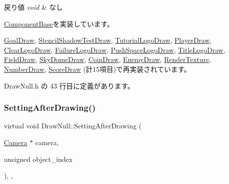 \begin{DoxyRetVals}{戻り値}
{\em void} & なし \\
\hline
\end{DoxyRetVals}


\mbox{\hyperlink{class_component_base_a125939d6befe42f28886a6523e86b18b}{Component\+Base}}を実装しています。



\mbox{\hyperlink{class_goal_draw_a3eb0a555fa2db9d2c1253018ea65796e}{Goal\+Draw}}, \mbox{\hyperlink{class_stencil_shadow_test_draw_a65be72e71cd12cacf315b0364c12c3e3}{Stencil\+Shadow\+Test\+Draw}}, \mbox{\hyperlink{class_tutorial_logo_draw_a53fc4b1b23c7f9e249600be67510f944}{Tutorial\+Logo\+Draw}}, \mbox{\hyperlink{class_player_draw_ad79a0fbeb618e0913822b573e5d0be68}{Player\+Draw}}, \mbox{\hyperlink{class_clear_logo_draw_a9af656c0a8ebfb5fa133a0983add6ffd}{Clear\+Logo\+Draw}}, \mbox{\hyperlink{class_failure_logo_draw_a718d587edcabb1feea72153a79a65176}{Failure\+Logo\+Draw}}, \mbox{\hyperlink{class_push_space_logo_draw_a7ad3fe53d9bda4ea16c958bc102ff54e}{Push\+Space\+Logo\+Draw}}, \mbox{\hyperlink{class_title_logo_draw_a9f70fb70639510908f4e07ee14667e30}{Title\+Logo\+Draw}}, \mbox{\hyperlink{class_field_draw_a4287d2ce33033b2413c1d3a81b173373}{Field\+Draw}}, \mbox{\hyperlink{class_sky_dome_draw_a5b82e8b650a20dbc0b7ed720d1fb7fab}{Sky\+Dome\+Draw}}, \mbox{\hyperlink{class_coin_draw_ad0f5da5cfb896541fd59b1ab4a8593d1}{Coin\+Draw}}, \mbox{\hyperlink{class_enemy_draw_aa1659c35fa757db6a6cf07e26ad9ddfb}{Enemy\+Draw}}, \mbox{\hyperlink{class_render_texture_a498eb8be8672e01164b3770cdff43291}{Render\+Texture}}, \mbox{\hyperlink{class_number_draw_ad52c1e8b9ae6e830a82c440cc18cb6c9}{Number\+Draw}}, \mbox{\hyperlink{class_score_draw_af013abb96136825e71d4fee06529fc69}{Score\+Draw}} (計15項目)で再実装されています。



 Draw\+Null.\+h の 43 行目に定義があります。

\mbox{\label{class_draw_null_a76edfc5af0bf3275f96f40394aff8510}} 
\subsubsection{\texorpdfstring{Setting\+After\+Drawing()}{SettingAfterDrawing()}}
{\footnotesize\ttfamily virtual void Draw\+Null\+::\+Setting\+After\+Drawing (\begin{DoxyParamCaption}\item[{\mbox{\hyperlink{class_camera}{Camera}} $\ast$}]{camera,  }\item[{unsigned}]{object\+\_\+index }\end{DoxyParamCaption})\hspace{0.3cm}{\ttfamily [inline]}, {\ttfamily [override]}, {\ttfamily [virtual]}}



